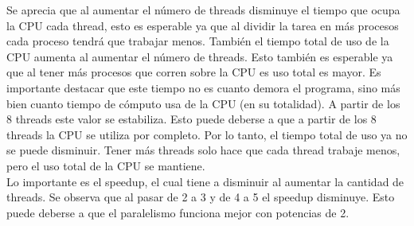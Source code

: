 \documentclass[10pt]{extarticle}
\begin{document}
Se aprecia que al aumentar el número de threads disminuye el tiempo que ocupa la CPU cada thread, esto es esperable ya que al dividir la tarea en más procesos cada proceso tendrá que trabajar menos. También el tiempo total de uso de la CPU aumenta al aumentar el número de threads. Esto también es esperable ya que al tener más procesos que corren sobre la CPU es uso total es mayor. Es importante destacar que este tiempo no es cuanto demora el programa, sino más bien cuanto tiempo de cómputo usa de la CPU (en su totalidad). A partir de los 8 threads este valor se estabiliza. Esto puede deberse a que a partir de los 8 threads la CPU se utiliza por completo. Por lo tanto, el tiempo total de uso ya no se puede disminuir. Tener más threads solo hace que cada thread trabaje menos, pero el uso total de la CPU se mantiene.\\

Lo importante es el speedup, el cual tiene a disminuir al aumentar la cantidad de threads. Se observa que al pasar de 2 a 3 y de 4 a 5 el speedup disminuye. Esto puede deberse a que el paralelismo funciona mejor con potencias de 2.\\
\end{document}
